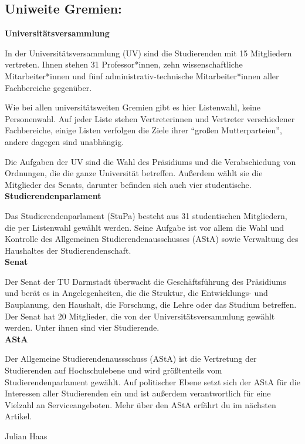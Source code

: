 {    \subsection*{Uniweite Gremien:}
    \noindent\textbf{Universitätsversammlung}

    In der Universitätsversammlung (UV) sind die Studierenden mit 15 Mitgliedern vertreten. Ihnen stehen 31 Professor*innen, zehn wissenschaftliche Mitarbeiter*innen und  fünf administrativ-technische Mitarbeiter*innen aller Fachbereiche gegenüber.

    \noindent Wie bei allen universitätsweiten Gremien gibt es hier Listenwahl, keine Personenwahl. Auf jeder Liste stehen Vertreterinnen und Vertreter verschiedener Fachbereiche, einige Listen verfolgen die Ziele ihrer "`großen Mutterparteien"', andere dagegen sind unabhängig.

    Die Aufgaben der UV sind die Wahl des Präsidiums und die Verabschiedung von Ordnungen, die die ganze Universität betreffen. Außerdem wählt sie die Mitglieder des Senats, darunter befinden sich auch vier studentische.\\

    \noindent\textbf{Studierendenparlament}

    Das Studierendenparlament (StuPa) besteht aus 31 studentischen Mitgliedern, die per Listenwahl gewählt werden. Seine Aufgabe ist vor allem die Wahl und Kontrolle des Allgemeinen Studierendenausschusses (AStA) sowie Verwaltung des Haushaltes der Studierendenschaft.\\

    \noindent\textbf{Senat}

    Der Senat der TU Darmstadt überwacht die Geschäftsführung des Präsidiums und berät es in Angelegenheiten, die die Struktur, die Entwicklungs- und Bauplanung, den Haushalt, die Forschung, die Lehre oder das Studium betreffen. Der Senat hat 20 Mitglieder, die von der Universitätsversammlung gewählt werden. Unter ihnen sind vier Studierende.\\

    \noindent\textbf{AStA}

    Der Allgemeine Studierendenaussschuss (AStA) ist die Vertretung der Studierenden auf Hochschulebene und wird größtenteils vom Studierendenparlament gewählt.
    Auf politischer Ebene setzt sich der AStA für die Interessen aller Studierenden ein und ist außerdem verantwortlich für eine Vielzahl an Serviceangeboten.
    Mehr über den AStA erfährt du im nächsten Artikel.

}
{Julian Haas}

